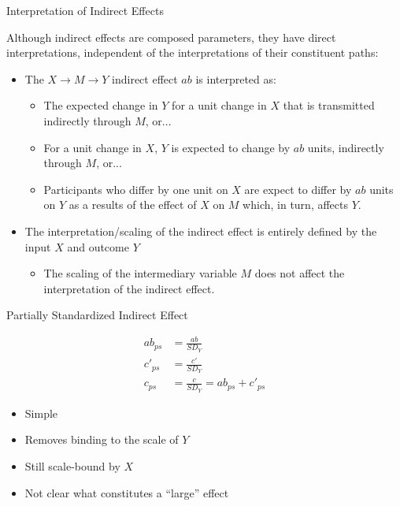 \documentclass{beamer}
\newcommand{\va}[0]{\vspace{12pt}}
\newcommand{\vb}[0]{\vspace{6pt}}
\begin{document}
\begin{frame}{Interpretation of Indirect Effects}
  
  Although indirect effects are composed parameters, they have direct
  interpretations, independent of the interpretations of their
  constituent paths:
  \vb
  \begin{itemize}
  \item The $X \rightarrow M \rightarrow Y$ indirect effect $ab$ is
    interpreted as:
    \vb
    \begin{itemize}
    \item The expected change in $Y$ for a unit change in $X$ that
      is transmitted indirectly through $M$, or...
      \vb
    \item For a unit change in $X$, $Y$ is expected to change by
      $ab$ units, indirectly through $M$, or...
      \vb
    \item Participants who differ by one unit on $X$ are expect
      to differ by $ab$ units on $Y$ as a results of the effect
      of $X$ on $M$ which, in turn, affects $Y$.
    \end{itemize}
    \va
  \item The interpretation/scaling of the indirect effect is entirely
    defined by the input $X$ and outcome $Y$
    \vb
    \begin{itemize}
    \item The scaling of the intermediary variable $M$ does not affect
      the interpretation of the indirect effect.
    \end{itemize}
  \end{itemize}
  
\end{frame}
  
  
\begin{frame}{Partially Standardized Indirect Effect}
  
  \begin{align*}
    ab_{ps} &= \frac{ab}{SD_Y}\\
    c'_{ps} &= \frac{c'}{SD_Y}\\
    c_{ps} &= \frac{c}{SD_Y} = ab_{ps} + c'_{ps}
  \end{align*}
  
  \begin{itemize}
    \item Simple
    \item Removes binding to the scale of $Y$
    \item Still scale-bound by $X$
    \item Not clear what constitutes a ``large'' effect
  \end{itemize}
  
\end{frame}
\end{document}
